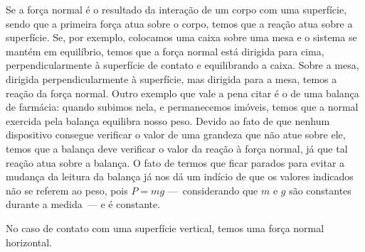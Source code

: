 Se a força normal é o resultado da interação de um corpo com uma superfície, sendo que a primeira força atua sobre o corpo, temos que a reação atua sobre a superfície. Se, por exemplo, colocamos uma caixa sobre uma mesa e o sistema se mantém em equilíbrio, temos que a força normal está dirigida para cima, perpendicularmente à superfície de contato e equilibrando a caixa. Sobre a mesa, dirigida perpendicularmente à superfície, mas dirigida para a mesa, temos a reação da força normal. Outro exemplo que vale a pena citar é o de uma balança de farmácia: quando subimos nela, e permanecemos imóveis, temos que a normal exercida pela balança equilibra nosso peso.  Devido ao fato de que nenhum dispositivo consegue verificar o valor de uma grandeza que não atue sobre ele, temos que a balança deve verificar o valor da reação à força normal, já que tal reação atua sobre a balança. O fato de termos que ficar parados para evitar a mudança da leitura da balança já nos dá um indício de que os valores indicados não se referem ao peso, pois $P = mg$ ---~considerando que $m$ e $g$ são constantes durante a medida~--- e é constante.

\begin{marginfigure}
\centering
{}
\caption{No caso de contato com uma superfície vertical, temos uma força normal horizontal.}
\end{marginfigure}

